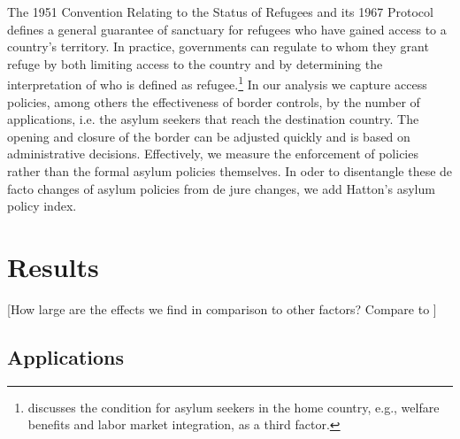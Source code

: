 \documentclass[a4paper,12pt]{article}
\begin{document}
The 1951 Convention Relating to the Status of Refugees and its 1967 Protocol defines a general guarantee of sanctuary for refugees who have gained access to a country's territory. In practice, governments can regulate to whom they grant refuge by both limiting access to the country and by determining the interpretation of who is defined as refugee.\footnote{\citet{hatton2009} discusses the condition for asylum seekers in the home country, e.g., welfare benefits and labor market integration, as a third factor.} In our analysis we capture access policies, among others the effectiveness of border controls, by the number of applications, i.e. the asylum seekers that reach the destination country. The opening and closure of the border can be adjusted quickly and is based on administrative decisions. Effectively, we measure the enforcement of policies rather than the formal asylum policies themselves. In oder to disentangle these de facto changes of asylum policies from de jure changes, we add Hatton's asylum policy index.

\section{Results} \label{sec:results}

[How large are the effects we find in comparison to other factors? Compare to \citet{thielemann2006}]

\subsection{Applications}
\end{document}
